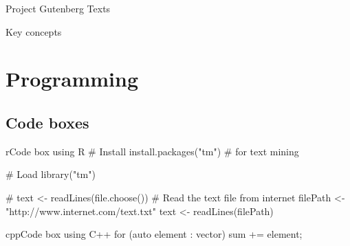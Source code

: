 \documentclass[10pt,a4paper]{article}
\begin{document}
\begin{multicols}{3}
\begin{textbox}{Project Gutenberg Texts}
\end{textbox}





\begin{textbox}{Key concepts}




\end{textbox}


\section{Programming}

\subsection{Code boxes}


\begin{codebox}{r}{Code box using R}
# Install
install.packages("tm")  # for text mining

# Load
library("tm")

# text <- readLines(file.choose())
# Read the text file from internet
filePath <- "http://www.internet.com/text.txt"
text <- readLines(filePath)

\end{codebox}


\begin{codebox}{cpp}{Code box using C++}
for (auto element : vector) 
{
    sum += element;
}
\end{codebox}

\end{multicols}
\end{document}
